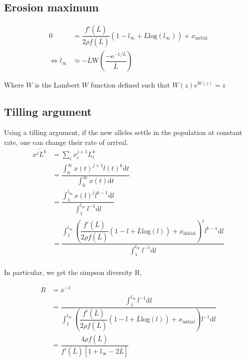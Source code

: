 \documentclass{article}
\begin{document}
\subsection{Erosion maximum}

\begin{equation}
  \begin{aligned}
    0 &=\dfrac{f'(\overline{L})}{2 \rho f(\overline{L})} (1-l_{\infty} + \overline{L} \mathrm{log}(l_{\infty})) + x_{\mathrm{initial}}\\
       \iff   l_{\infty} &\simeq - \overline{L} \mathrm{W} \left(\dfrac{ - \mathrm{e}^{- 1 / \overline{L}}}{\overline{L}}  \right)
  \end{aligned}
\end{equation}

Where $W$ is the Lambert $W$ function defined such that $W(z)e^{W(z)}=z$
\subsection{Tilling argument}

Using a tilling argument, if the new alleles settle in the population at constant rate, one can change their rate of arrival.
\begin{equation}
  \begin{aligned}
    \overline{x^{j} L^{k}} &= \sum_i x_i^{j+1} L_i^{k} \\
    &= \dfrac{ \int_{0}^{\infty} x(t)^{j+1} l(t)^{k} \mathrm{d} t }{ \int_{0}^{\infty} x(t) \mathrm{d} t }
    \\
    &= \dfrac{ \int_{1}^{l_{\infty}} x(l)^{j} l^{k-1} \mathrm{d} l  }{ \int_{1}^{l_{\infty}} l^{-1} \mathrm{d} l }
    \\
    &= \dfrac{ \int_{1}^{l_{\infty}} \left( \dfrac{f'(\overline{L})}{2 \rho f(\overline{L})} (1-l + \overline{L} \mathrm{log}(l)) + x_{\mathrm{initial}}  \right)^{j} l^{k-1} \mathrm{d} l  }{ \int_{1}^{l_{\infty}} l^{-1} \mathrm{d} l }
    \\
  \end{aligned}
\end{equation}

In particular, we get the simpson diversity R,

\begin{equation}
  \begin{aligned}
    R &= \overline{x}^{-1} \\
    &=  \dfrac{ \int_{1}^{l_{\infty}} l^{-1} \mathrm{d} l }{ \int_{1}^{l_{\infty}} \left( \dfrac{f'(\overline{L})}{2 \rho f(\overline{L})} (1-l + \overline{L} \mathrm{log}(l)) + x_{\mathrm{initial}}  \right) l^{-1} \mathrm{d} l } 
    \\
    &= \dfrac{4 \rho f(\overline{L})}{f'(\overline{L})\left[ 1 + l_{\infty} - 2 \overline{L}  \right]} 
    \\
  \end{aligned}
\end{equation}
\end{document}

